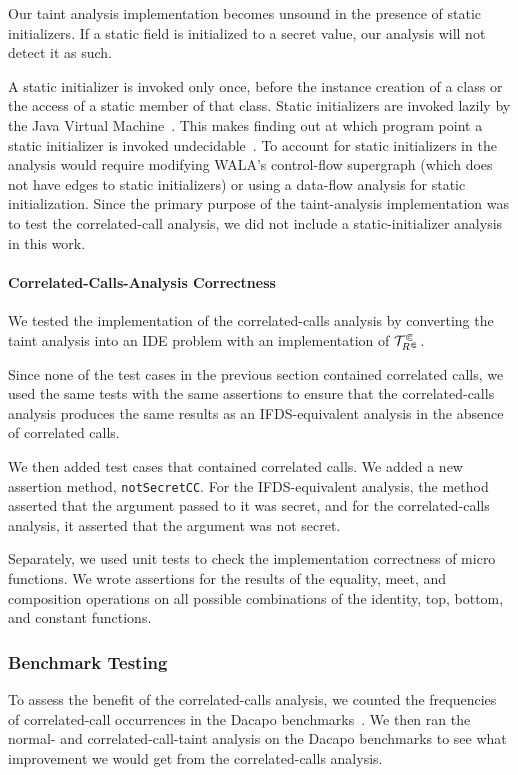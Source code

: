 \begin{mdelete}
Our taint analysis implementation becomes unsound in the presence of static initializers. If a static field is initialized to a secret value, our analysis will not detect it as such.

A static initializer is invoked only once, before the instance creation of a class or the access of a static member of that class.
Static initializers are invoked lazily by the Java Virtual Machine~\cite{lindholmjava}. This makes finding out at which program point a static initializer is invoked undecidable~\cite{hubert2009soundly}. To account for static initializers in the analysis would require modifying WALA's control-flow supergraph (which does not have edges to static initializers) or using a data-flow analysis for static initialization. Since the primary purpose of the taint-analysis implementation was to test the correlated-call analysis, we did not include a static-initializer analysis in this work.
\end{mdelete}

\paragraph{Correlated-Calls-Analysis Correctness}
We tested the implementation of the correlated-calls analysis by converting the taint analysis into an IDE problem with an implementation of $\mathcal T^\Subset_{R^\Subset}$.

Since none of the test cases in the previous section contained correlated calls, we used the same tests with the same assertions to ensure that the correlated-calls analysis produces the same results as an IFDS-equivalent analysis in the absence of correlated calls.

We then added test cases that contained correlated calls. We added a new assertion method, \verb'notSecretCC'. For the IFDS-equivalent analysis, the method asserted that the argument passed to it was secret, and for the correlated-calls analysis, it asserted that the argument was not secret.

Separately, we used unit tests to check the implementation correctness of micro functions. We wrote assertions for the results of the equality, meet, and composition operations on all possible combinations of the identity, top, bottom, and constant functions.

\subsubsection{Benchmark Testing}
To assess the benefit of the correlated-calls analysis, we counted the frequencies of correlated-call occurrences in the Dacapo benchmarks~\cite{blackburn2006dacapo}. We then ran the normal- and correlated-call-taint analysis on the Dacapo benchmarks to see what improvement we would get from the correlated-calls analysis.

